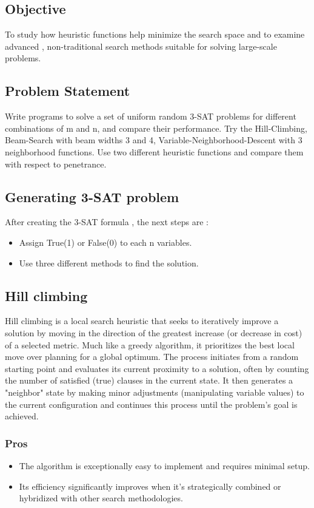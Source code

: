 \documentclass[conference]{IEEEtran}
\begin{document}
\subsection{Objective}
To study how heuristic functions help minimize the search space and to examine advanced , non-traditional search methods suitable for solving large-scale problems.

\subsection{Problem Statement}
Write programs to solve a set of uniform random 3-SAT problems for different combinations of m and n, and compare their performance.  Try the Hill-Climbing, Beam-Search with beam widths 3 and 4, Variable-Neighborhood-Descent with 3 neighborhood functions.  Use two different heuristic functions and compare them with respect to penetrance.

\subsection{Generating 3-SAT problem}
After creating the 3-SAT formula , the next steps are :
\begin{itemize}
    \item Assign True(1) or False(0) to each n variables. 
    \item Use three different methods to find the solution.
\end{itemize}


\subsection{Hill climbing}
Hill climbing is a local search heuristic that seeks to iteratively improve a solution by moving in the direction of the greatest increase (or decrease in cost) of a selected metric. Much like a greedy algorithm, it prioritizes the best local move over planning for a global optimum. The process initiates from a random starting point and evaluates its current proximity to a solution, often by counting the number of satisfied (true) clauses in the current state. It then generates a "neighbor" state by making minor adjustments (manipulating variable values) to the current configuration and continues this process until the problem's goal is achieved.

\subsubsection{Pros}
\begin{itemize}
    \item The algorithm is exceptionally easy to implement and requires minimal setup.
    \item Its efficiency significantly improves when it's strategically combined or hybridized with other search methodologies.
\end{itemize}
\end{document}
